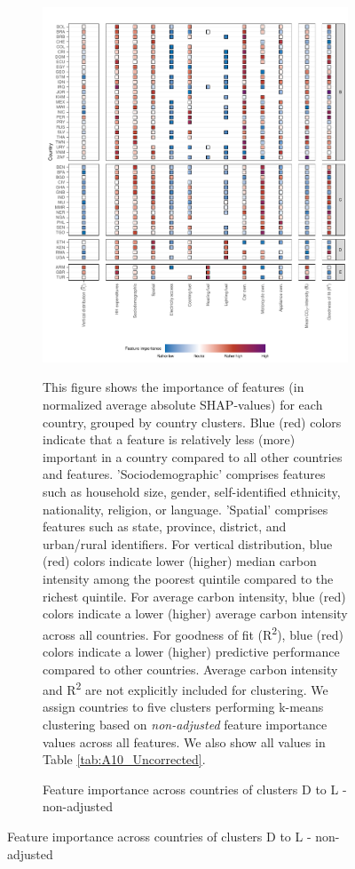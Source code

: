 \clearpage
\begin{figure}[ht!]\ContinuedFloat
    \centering
    \begin{subfigure}[b]{\textwidth}
    \centering
    \includegraphics{Figure 4/Figure_4_Uncorrected_2.pdf}
    \caption{Feature importance across countries of clusters D to L - non-adjusted}\label{fig:fig_4_2_uncorrected}
    \begin{subcaption2}
    This figure shows the importance of features (in normalized average absolute SHAP-values) for each country, grouped by country clusters. Blue (red) colors indicate that a feature is relatively less (more) important in a country compared to all other countries and features. 'Sociodemographic' comprises features such as household size, gender, self-identified ethnicity, nationality, religion, or language. 'Spatial' comprises features such as state, province, district, and urban/rural identifiers. For vertical distribution, blue (red) colors indicate lower (higher) median carbon intensity among the poorest quintile compared to the richest quintile. For average carbon intensity, blue (red) colors indicate a lower (higher) average carbon intensity across all countries. For goodness of fit (R\textsuperscript{2}), blue (red) colors indicate a lower (higher) predictive performance compared to other countries. Average carbon intensity and R\textsuperscript{2} are not explicitly included for clustering.
    We assign countries to five clusters performing k-means clustering based on \textit{non-adjusted} feature importance values across all features. We also show all values in Table \ref{tab:A10_Uncorrected}.
    \end{subcaption2}
    \end{subfigure}
    
\end{figure}
\clearpage

